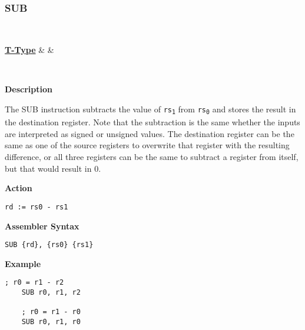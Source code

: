 \subsubsection{SUB }\label{sec:SUB}

\vspace{3ex}

\begin{center}
	\begin{bytefield}[leftcurly=., leftcurlyspace=0pt]{32}
		 \\
		\begin{leftwordgroup}{\hyperref[sec:t-type]{\textbf{T-Type}}}
		 & 
		 &
		\end{leftwordgroup}\\
	\end{bytefield}
\end{center}

\textbf{Description}

The SUB instruction subtracts the value of \texttt{rs\textsubscript{1}} from \texttt{rs\textsubscript{0}} and stores the result in the destination register.
Note that the subtraction is the same whether the inputs are interpreted as signed or unsigned values.
The destination register can be the same as one of the source registers to overwrite that register with the resulting difference,
or all three registers can be the same to subtract a register from itself, but that would result in 0.
\vspace{3ex}

\textbf{Action}
\begin{lstlisting}[frame=single]
	rd := rs0 - rs1
\end{lstlisting}

\vspace{3ex}

\textbf{Assembler Syntax}
\begin{lstlisting}[frame=single]
	SUB {rd}, {rs0} {rs1}
\end{lstlisting}

\vspace{3ex}

\textbf{Example}
\begin{lstlisting}[frame=single]
	; r0 = r1 - r2
	SUB r0, r1, r2
	
	; r0 = r1 - r0
	SUB r0, r1, r0
\end{lstlisting} 

